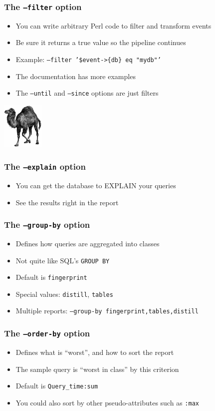 \begin{frame}
   \frametitle{The \texttt{--filter} option}
   \begin{itemize}
      \item You can write arbitrary Perl code to filter and transform events
      \item Be sure it returns a true value so the pipeline continues
      \item Example: \texttt{--filter '\$event->\{db\} eq "mydb"'}
      \item The documentation has more examples
      \item The \texttt{--until} and \texttt{--since} options are just filters
   \end{itemize}
   \includegraphics[width=20mm]{../image/perl}
\end{frame}

\begin{frame}
   \frametitle{The \texttt{--explain} option}
   \begin{itemize}
      \item You can get the database to EXPLAIN your queries
      \item See the results right in the report
   \end{itemize}
\end{frame}

\begin{frame}
   \frametitle{The \texttt{--group-by} option}
   \begin{itemize}
      \item Defines how queries are aggregated into classes
      \item Not quite like SQL's \texttt{GROUP BY}
      \item Default is \texttt{fingerprint}
      \item Special values: \texttt{distill}, \texttt{tables}
      \item Multiple reports: \texttt{--group-by fingerprint,tables,distill}
   \end{itemize}
\end{frame}

\begin{frame}
   \frametitle{The \texttt{--order-by} option}
   \begin{itemize}
      \item Defines what is ``worst'', and how to sort the report
      \item The sample query is ``worst in class'' by this criterion
      \item Default is \texttt{Query\_time:sum}
      \item You could also sort by other pseudo-attributes such as \texttt{:max}
   \end{itemize}
\end{frame}


